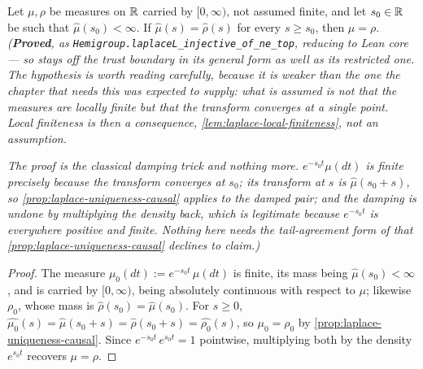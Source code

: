 \begin{proposition}\label{prop:laplace-uniqueness-sigma-finite}
\leanok
Let $\mu, \rho$ be measures on $\mathbb{R}$ carried by $[0,\infty)$, not assumed finite, and let
$s_0 \in \mathbb{R}$ be such that $\hat\mu(s_0) < \infty$. If $\hat\mu(s) = \hat\rho(s)$ for every
$s \ge s_0$, then $\mu = \rho$.
\statusT\quad\emph{(\textbf{Proved}, as \texttt{Hemigroup.laplaceL\_injective\_of\_ne\_top},
reducing to Lean core --- so  stays off the trust boundary in its general form as
well as its restricted one. The hypothesis is worth reading carefully, because it is weaker than
the one the chapter that needs this was expected to supply: what is assumed is not that the
measures are locally finite but that \emph{the transform converges at a single point}. Local
finiteness is then a consequence, \ref{lem:laplace-local-finiteness}, not an assumption.}

\emph{The proof is the classical damping trick and nothing more. $e^{-s_0 t}\mu(dt)$ is finite
precisely because the transform converges at $s_0$; its transform at $s$ is $\hat\mu(s_0 + s)$,
so \ref{prop:laplace-uniqueness-causal} applies to the damped pair; and the damping is undone by
multiplying the density back, which is legitimate because $e^{-s_0t}$ is everywhere positive and
finite. Nothing here needs the tail-agreement form of  that
\ref{prop:laplace-uniqueness-causal} declines to claim.)}
\end{proposition}

\begin{proof}
\leanok
The measure $\mu_0(dt) := e^{-s_0 t}\,\mu(dt)$ is finite, its mass being $\hat\mu(s_0) < \infty$,
and is carried by $[0,\infty)$, being absolutely continuous with respect to $\mu$; likewise
$\rho_0$, whose mass is $\hat\rho(s_0) = \hat\mu(s_0)$. For $s \ge 0$,
$\hat{\mu_0}(s) = \hat\mu(s_0 + s) = \hat\rho(s_0 + s) = \hat{\rho_0}(s)$, so $\mu_0 = \rho_0$ by
\ref{prop:laplace-uniqueness-causal}. Since $e^{-s_0t}\,e^{s_0t} = 1$ pointwise, multiplying both
by the density $e^{s_0 t}$ recovers $\mu = \rho$.
\end{proof}

